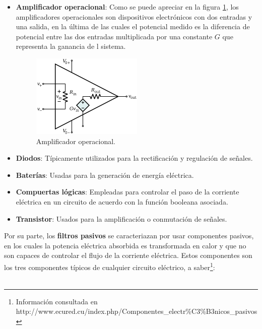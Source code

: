 \documentclass[prb,aps,preprintnumbers,amsmath,amssymb]{revtex4}
\begin{document}
\begin{itemize}
	\item \textbf{Amplificador operacional}: Como se puede apreciar en la figura \ref{fig: amplificador}, los amplificadores operacionales son dispositivos electrónicos con dos entradas y una salida, en la última de las cuales el potencial medido es la diferencia de potencial entre las dos entradas multiplicada por una constante $G$ que representa la ganancia de l sistema.
	
	\begin{figure}[h!]
		\centering
		\includegraphics[width=0.5\textwidth]{amplificador}
		\caption{Amplificador operacional.}
		\label{fig: amplificador}
	\end{figure}
	
	\item \textbf{Diodos}: Típicamente utilizados para la rectificación y regulación de señales. 
	
	\item \textbf{Baterías}: Usadas para la generación de energía eléctrica.
	
	\item \textbf{Compuertas lógicas}: Empleadas para controlar el paso de la corriente eléctrica en un circuito de acuerdo con la función booleana asociada.
	
	\item \textbf{Transistor}: Usados para la amplificación o conmutación de señales.
\end{itemize}

Por su parte, los \textbf{filtros pasivos} se caracteriazan por usar componentes pasivos, en los cuales la potencia eléctrica absorbida es transformada en calor y que no son capaces de controlar el flujo de la corriente eléctrica. Estos componentes son los tres componentes típicos de cualquier circuito eléctrico, a saber\footnote{Información consultada en http://www.ecured.cu/index.php/Componentes\_electr\%C3\%B3nicos\_pasivos\\}: \\\\
\end{document}
